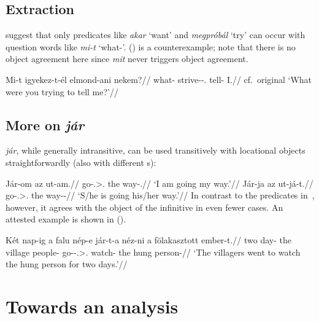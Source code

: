 \subsection{Extraction}\label{sub:question-words}

\textcite[34]{KenVagFeny1998} suggest that only predicates like \emph{akar}
\enquote*{want} and \emph{megpróbál} \enquote*{try} can occur with question
words like \emph{mi-t} \enquote*{what-\Acc}. (\nextx) is a counterexample;
note that there is no object agreement here since \emph{mit} never triggers
object agreement.

\ex\label{ex:mit-igyek}%
    \begingl
        \gla 	Mi-t igyekez-t-él elmond-ani nekem?//
        \glb 	what-\Acc{} strive-\Pst-\Ssg.\Sbj{} tell-\Inf{} I.\Dat{}//
        \glft 	cf.\ original \enquote*{What were you trying to tell me?}//
    \endgl
\xe

\subsection{More on \emph{jár}}\label{sub:more-on-jar}

\emph{jár}, while generally intransitive, can be used transitively with
locational objects straightforwardly (also with different \Vm{}s):

\pex
    \a
    \begingl
        \gla 	Jár-om az ut-am.//
        \glb 	go-\Fsg.\Sbj>\Third.\Obj{} the way-\Fsg{}.\Poss{}//
        \glft 	\enquote*{I am going my way.}//
    \endgl
    \a
    \begingl
        \gla 	Jár-ja az ut-já-t.//
        \glb 	go-\Tsg.\Sbj>\Third.\Obj{} the way-\Tsg{}-\Acc{}//
        \glft 	\enquote*{S/he is going his/her way.}//
    \endgl
\xe
In contrast to the predicates in~, however, it agrees with the
object of the infinitive in even fewer cases. An attested example is shown in
(\nextx).

\ex\label{ex:jarta-nezni}
    \begingl
        \gla 	Két nap-ig a falu nép-e jár-t-a néz-ni a fölakasztott ember-t.//
        \glb 	two day-\Term{} the village people-\Tsg{} go-\Pst-\Tsg.\Sbj>\Third.\Obj{} watch-\Inf{} the hung person-\Acc{}//
        \glft 	\enquote*{The villagers went to watch the hung person for two days.}//
    \endgl
\xe

\section{Towards an analysis}\label{sec:analysis}

